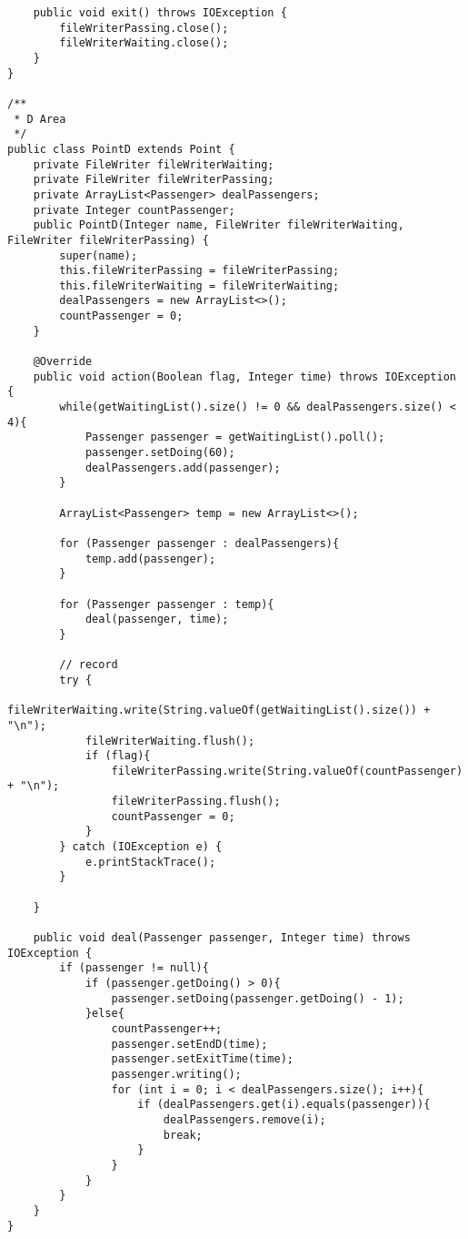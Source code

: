 \begin{lstlisting}
    public void exit() throws IOException {
        fileWriterPassing.close();
        fileWriterWaiting.close();
    }
}

/**
 * D Area
 */
public class PointD extends Point {
    private FileWriter fileWriterWaiting;
    private FileWriter fileWriterPassing;
    private ArrayList<Passenger> dealPassengers;
    private Integer countPassenger;
    public PointD(Integer name, FileWriter fileWriterWaiting, FileWriter fileWriterPassing) {
        super(name);
        this.fileWriterPassing = fileWriterPassing;
        this.fileWriterWaiting = fileWriterWaiting;
        dealPassengers = new ArrayList<>();
        countPassenger = 0;
    }

    @Override
    public void action(Boolean flag, Integer time) throws IOException {
        while(getWaitingList().size() != 0 && dealPassengers.size() < 4){
            Passenger passenger = getWaitingList().poll();
            passenger.setDoing(60);
            dealPassengers.add(passenger);
        }

        ArrayList<Passenger> temp = new ArrayList<>();

        for (Passenger passenger : dealPassengers){
            temp.add(passenger);
        }

        for (Passenger passenger : temp){
            deal(passenger, time);
        }

        // record
        try {
            fileWriterWaiting.write(String.valueOf(getWaitingList().size()) + "\n");
            fileWriterWaiting.flush();
            if (flag){
                fileWriterPassing.write(String.valueOf(countPassenger) + "\n");
                fileWriterPassing.flush();
                countPassenger = 0;
            }
        } catch (IOException e) {
            e.printStackTrace();
        }

    }

    public void deal(Passenger passenger, Integer time) throws IOException {
        if (passenger != null){
            if (passenger.getDoing() > 0){
                passenger.setDoing(passenger.getDoing() - 1);
            }else{
                countPassenger++;
                passenger.setEndD(time);
                passenger.setExitTime(time);
                passenger.writing();
                for (int i = 0; i < dealPassengers.size(); i++){
                    if (dealPassengers.get(i).equals(passenger)){
                        dealPassengers.remove(i);
                        break;
                    }
                }
            }
        }
    }
}

\end{lstlisting}



